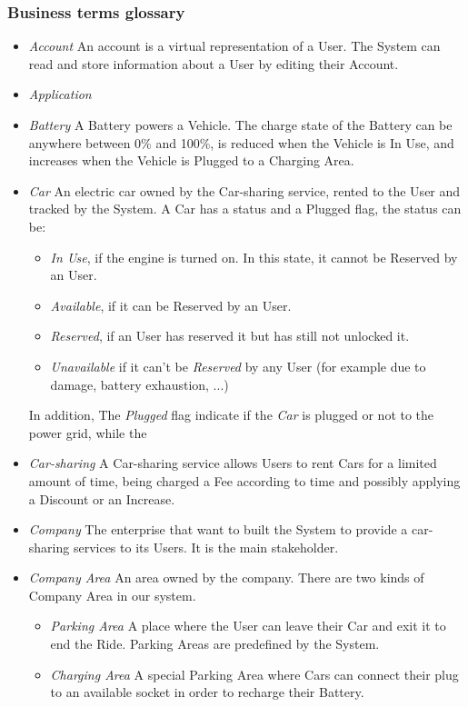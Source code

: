 \subsubsection{Business terms glossary}
\begin{itemize}
	\item \emph{Account}
	An account is a virtual representation of a User. The System can read and store information about a User by editing their Account.
	
	\item \emph{Application}
	
	\item \emph{Battery}
	A Battery powers a Vehicle. The charge state of the Battery can be anywhere between 0\% and 100\%, is reduced when the Vehicle is In Use, and increases when the Vehicle is Plugged to a Charging Area.

	
	\item \emph{Car}
	An electric car owned by the Car-sharing service, rented to the User and tracked by the System. A Car has a status and a Plugged flag, the status can be:
	\begin{itemize}
		\item \textit{In Use}, if the engine is turned on. In this state, it cannot be Reserved by an User.
		\item \textit{Available}, if it can be Reserved by an User.
		\item \textit{Reserved}, if an User has reserved it but has still not unlocked it.
		\item \textit{Unavailable} if it can't be \textit{Reserved} by any User (for example due to damage, battery exhaustion, ...)
	\end{itemize}
	In addition, The \textit{Plugged} flag indicate if the \emph{Car} is plugged or not to the power grid, while the 
	
	\item \emph{Car-sharing}
	A Car-sharing service allows Users to rent Cars for a limited amount of time, being charged a Fee according to time and possibly applying a Discount or an Increase.

	\item \emph{Company}
	The enterprise that want to built the System to provide a car-sharing services to its Users. It is the main stakeholder.

	\item \emph{Company Area}
	An area owned by the company. There are two kinds of Company Area in our system.
	\begin{itemize}
		\item \emph{Parking Area}
		A place where the User can leave their Car and exit it to end the Ride. Parking Areas are predefined by the System.
		\item \emph{Charging Area}
		A special Parking Area where Cars can connect their plug to an available socket in order to recharge their Battery.		
	\end{itemize}	


\end{itemize}
